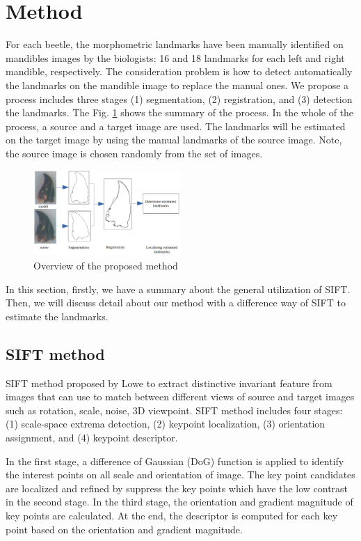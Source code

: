 \documentclass{gretsi}
\begin{document}
\section{Method}
For each beetle, the morphometric landmarks have been manually identified on mandibles images by the biologists: 16 and 18 landmarks for each left and right mandible, respectively. The consideration problem is how to detect automatically the landmarks on the mandible image to replace the manual ones. We propose a process includes three stages (1) segmentation, (2) registration, and (3) detection the landmarks. The Fig. \ref{fig2} shows the summary of the process. In the whole of the process, a source and a target image are used. The landmarks will be estimated on the target image by using the manual landmarks of the source image. Note, the source image is chosen randomly from the set of images.

\begin{figure}[htb]
    \centering
    \includegraphics[width=0.5\textwidth]{./images/method}
    \caption{Overview of the proposed method}
    \label{fig2}
\end{figure}

In this section, firstly, we have a summary about the general utilization of SIFT. Then, we will discuss detail about our method with a difference way of SIFT to estimate the landmarks.
\subsection{SIFT method}
SIFT method proposed by Lowe\cite{} to extract distinctive invariant feature from images that can use to match between different views of source and target images such as rotation, scale, noise, 3D viewpoint. SIFT method includes four stages: (1) scale-space extrema detection, (2) keypoint localization, (3) orientation assignment, and (4) keypoint descriptor.

In the first stage, a difference of Gaussian (DoG) function is applied to identify the interest points on all scale and orientation of image. The key point candidates are localized and refined by suppress the key points which have the low contrast in the second stage. In the third stage, the orientation and gradient magnitude of key points are calculated. At the end, the descriptor is computed for each key point based on the orientation and gradient magnitude.
\end{document}
